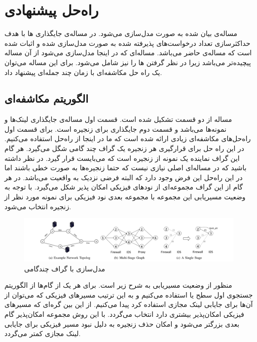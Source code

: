 
\chapter{راه‌حل پیشنهادی}

مساله‌ی بیان شده به صورت 
مدل‌سازی می‌شود.
در \cite{Eramo2016}
مساله‌ی جایگذاری ها با هدف حداکثرسازی تعداد درخواست‌های پذیرفته شده
به صورت  مدل‌سازی شده و اثبات شده است که مساله‌ی حاضر  می‌باشد.
مساله‌ای که در اینجا مدل‌سازی می‌شود از آن مساله پیچیده‌تر می‌باشد زیرا در نظر گرفتن ها را نیز شامل می‌شود.
برای این مساله می‌توان
یک راه حل مکاشفه‌ای با زمان چند جمله‌ای
پیشنهاد داد.

\section{الگوریتم مکاشفه‌ای}

مساله از دو قسمت تشکیل شده است. قسمت اول مساله‌ی جایگذاری لینک‌ها و نمونه‌ها می‌باشد
و قسمت دوم جایگذاری
برای زنجیره است.
برای قسمت اول راه‌حل‌های مکاشفه‌ای زیادی ارائه شده است که ما در اینجا
از راه‌حل \cite{Bari2015} استفاده می‌کنیم.
در این راه حل برای قرارگیری هر زنجیره یک گراف چند گامی شگل می‌گیرد.
هر گام این گراف نماینده یک نمونه از زنجیره است که می‌بایست قرار گیرد.
در نظر داشته باشید که در مساله‌ای اصلی نیازی نیست که حتما زنجیره‌ها به صورت خطی باشند اما در این راه‌حل این فرض وجود دارد
که البته فرضی نزدیک به واقعیت می‌باشد.
در هر گام از این گراف مجموعه‌ای از نودهای فیزیکی امکان پذیر شکل می‌گیرد.
با توجه به وضعیت مسیریابی این مجموعه با مجموعه بعدی نود فیزیکی برای نمونه مورد نظر از زنجیره انتخاب می‌شود.

\begin{figure}[h]
\center\includegraphics[scale=.45]{images/bari}
\caption{مدل‌سازی با گراف چندگامی \cite{Bari2015}}
\label{fig.5}
\end{figure}

منظور از وضعیت مسیریابی به شرح زیر است. برای هر یک از گام‌ها از الگوریتم جستجوی اول سطح یا
استفاده می‌کنیم
و به این ترتیب مسیرهای فیزیکی که می‌توان از آن‌ها برای جایابی لینک مجازی استفاده کرد پیدا می‌کنیم.
از این بین گره‌ای که مسیرهای فیزیکی امکان‌پذیر بیشتری دارد انتخاب می‌گردد.
با این روش مجموعه امکان‌پذیر گام بعدی بزرگتر می‌شود و امکان حذف زنجیره به دلیل نبود مسیر فیزیکی
برای جایابی لینک مجازی کمتر می‌گردد.

